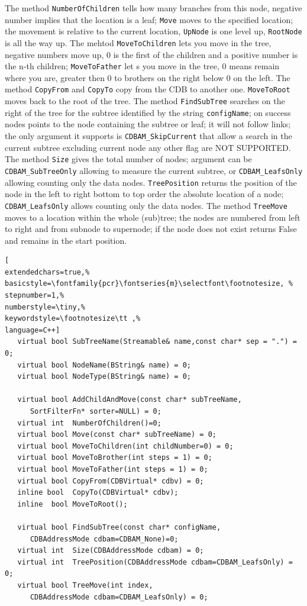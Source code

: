 The method \texttt{NumberOfChildren} tells how many branches from this node, negative number implies that the location is a leaf; \texttt{Move} moves to the specified location; the movement is relative to the current location, \texttt{UpNode} is one level up, \texttt{RootNode} is all the way up. The mehtod \texttt{MoveToChildren} lets you move in the tree, negative numbers move up, 0 is the first of the children and a positive number is the n-th children; \texttt{MoveToFather} let s you move in the tree, 0 means remain where you are, greater then 0 to brothers on the right below 0 on the left. The method \texttt{CopyFrom} and \texttt{CopyTo} copy from the CDB to another one. \texttt{MoveToRoot} moves back to the root of the tree.
The method \texttt{FindSubTree} searches on the right of the tree for the subtree identified by the string \texttt{configName}; on success nodes points to the node containing the subtree or leaf; it will not follow links; the only argument it supports is \texttt{CDBAM\_SkipCurrent} that allow a search in the current subtree excluding current node any other flag are NOT SUPPORTED.
The method \texttt{Size} gives the total number of nodes; argument can be \texttt{CDBAM\_SubTreeOnly} allowing to measure the current subtree, or \texttt{CDBAM\_LeafsOnly}   allowing counting only the data nodes. \texttt{TreePosition} returns the position of the node in the left to right bottom to top order the absolute location of a node; \texttt{CDBAM\_LeafsOnly} allows counting only the data nodes. The method \texttt{TreeMove} moves to a location within the whole (sub)tree; the nodes are numbered from left to right and from subnode to supernode; if the node does not exist returns False and remains in the start position.

\begin{lstlisting}[
extendedchars=true,%
basicstyle=\fontfamily{pcr}\fontseries{m}\selectfont\footnotesize, %
stepnumber=1,%
numberstyle=\tiny,%
keywordstyle=\footnotesize\tt ,%
language=C++]
   virtual bool SubTreeName(Streamable& name,const char* sep = ".") = 0;
   virtual bool NodeName(BString& name) = 0;
   virtual bool NodeType(BString& name) = 0;

   virtual bool AddChildAndMove(const char* subTreeName,
      SortFilterFn* sorter=NULL) = 0;
   virtual int  NumberOfChildren()=0;
   virtual bool Move(const char* subTreeName) = 0;
   virtual bool MoveToChildren(int childNumber=0) = 0;
   virtual bool MoveToBrother(int steps = 1) = 0;
   virtual bool MoveToFather(int steps = 1) = 0;
   virtual bool CopyFrom(CDBVirtual* cdbv) = 0;
   inline bool  CopyTo(CDBVirtual* cdbv);
   inline  bool MoveToRoot();

   virtual bool FindSubTree(const char* configName,
      CDBAddressMode cdbam=CDBAM_None)=0;
   virtual int  Size(CDBAddressMode cdbam) = 0;
   virtual int  TreePosition(CDBAddressMode cdbam=CDBAM_LeafsOnly) = 0;
   virtual bool TreeMove(int index,
      CDBAddressMode cdbam=CDBAM_LeafsOnly) = 0;
\end{lstlisting}

